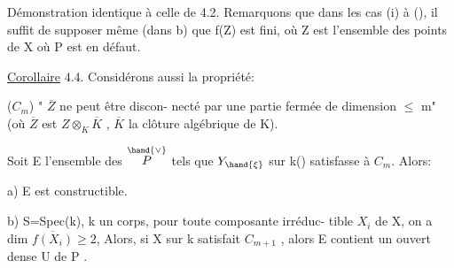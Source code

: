 Démonstration identique à celle de 4.2.   Remarquons que dans
les cas (i) à (), il suffit de supposer même (dans b) que  f(Z) est
fini, où Z est l'ensemble des points de X où  P est en défaut.

\uline{Corollaire} 4.4.    Considérons aussi la propriété:

($C_m$)   " $\overline{Z}$ ne peut être discon-%
necté par une partie fermée de dimension  $\leqslant$ m" (où $\overline{Z}$ est $Z\otimes_K\overline{K}$ , $\overline{K}$
la clôture  algébrique de K).

Soit E l'ensemble des \hand{$\xi \in$} $\overset{\hand{\vee}}{P}$  tels que  $Y_{\hand{\xi}}$ sur k(\hand{$\xi$}) satisfasse à $C_m$.
Alors:

a)  E est constructible.

b)    S=Spec(k), k un corps,   pour toute composante irréduc-%
tible  $X_i$ de X, on a dim $\overline{f(X_i)} \geqslant 2$, Alors, si X sur k satisfait $C_{m+1}$ ,
alors E\hand{$_{\unsure{\xi}}$} contient un ouvert dense U de P .


